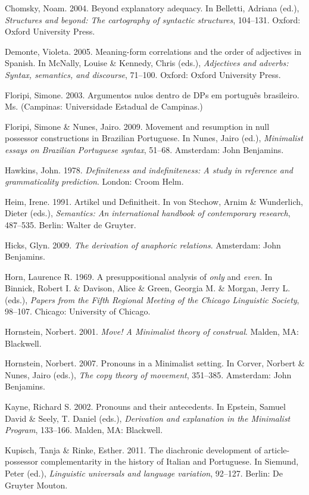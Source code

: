 \documentclass[output=paper]{langsci/langscibook}
\begin{document}
Chomsky, Noam. 2004. Beyond explanatory adequacy. In Belletti, Adriana (ed.), \textit{Structures and beyond: The cartography of syntactic structures}, 104–131. Oxford: Oxford University Press.

Demonte, Violeta. 2005. Meaning-form correlations and the order of adjectives in Spanish. In McNally, Louise \& Kennedy, Chris (eds.), \textit{Adjectives and adverbs: Syntax, semantics, and discourse}, 71–100. Oxford: Oxford University Press.

Floripi, Simone. 2003. Argumentos nulos dentro de DPs em português brasileiro. Ms. (Campinas: Universidade Estadual de Campinas.)

Floripi, Simone \& Nunes, Jairo. 2009. Movement and resumption in null possessor constructions in Brazilian Portuguese. In Nunes, Jairo (ed.), \textit{Minimalist essays on Brazilian Portuguese syntax}, 51–68. Amsterdam: John Benjamins.

Hawkins, John. 1978. \textit{Definiteness and indefiniteness: A study in reference and grammaticality prediction}. London: Croom Helm.

Heim, Irene. 1991. Artikel und Definitheit. In von Stechow, Arnim \& Wunderlich, Dieter (eds.), \textit{Semantics: An international handbook of contemporary research}, 487–535. Berlin: Walter de Gruyter.

Hicks, Glyn. 2009. \textit{The derivation of anaphoric relations}. Amsterdam: John Benjamins.

Horn, Laurence R. 1969. A presuppositional analysis of \textit{only} and \textit{even}. In Binnick, Robert I. \& Davison, Alice \& Green, Georgia M. \& Morgan, Jerry L. (eds.), \textit{Papers from the Fifth Regional Meeting of the Chicago Linguistic Society}, 98–107. Chicago: University of Chicago.

Hornstein, Norbert. 2001. \textit{Move! A Minimalist theory of construal}. Malden, MA: Blackwell.

Hornstein, Norbert. 2007. Pronouns in a Minimalist setting. In Corver, Norbert \& Nunes, Jairo (eds.), \textit{The copy theory of movement}, 351–385. Amsterdam: John Benjamins.

Kayne, Richard S. 2002. Pronouns and their antecedents. In Epstein, Samuel David \& Seely, T. Daniel (eds.), \textit{Derivation and explanation in the Minimalist Program}, 133–166. Malden, MA: Blackwell.

Kupisch, Tanja \& Rinke, Esther. 2011. The diachronic development of article-possessor complementarity in the history of Italian and Portuguese. In Siemund, Peter (ed.), \textit{Linguistic universals and language variation}, 92–127. Berlin: De Gruyter Mouton.
\end{document}
